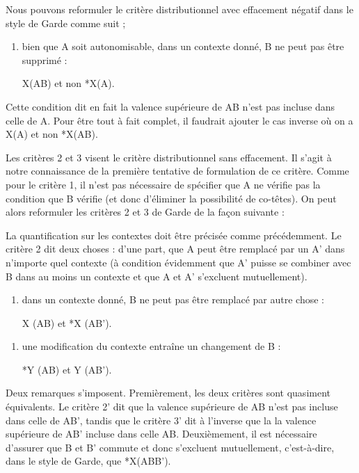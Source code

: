 {   Nous pouvons reformuler le critère distributionnel avec effacement négatif dans le style de Garde comme suit ;
    
    \begin{enumerate}[label=1'.] \item  bien que A soit autonomisable, dans un contexte donné, B ne peut pas être supprimé :
    
    \begin{center}X(AB) et non *X(A).\end{center}
    \end{enumerate}
    
    Cette condition dit en fait la valence supérieure de AB n'est pas incluse dans celle de A.
    Pour être tout à fait complet, il faudrait ajouter le cas inverse où on a X(A) et non *X(AB).
    
    Les critères 2 et 3 visent le critère distributionnel sans effacement. Il s'agit à notre connaissance de la première tentative de formulation de ce critère. Comme pour le critère 1, il n'est pas nécessaire de spécifier que A ne vérifie pas la condition que B vérifie (et donc d'éliminer la possibilité de co-têtes). On peut alors reformuler les critères 2 et 3 de Garde de la façon suivante :
    
    La quantification sur les contextes doit être précisée comme précédemment. Le critère 2 dit deux choses : d’une part, que A peut être remplacé par un A’ dans n’importe quel contexte (à condition évidemment que A’ puisse se combiner avec B dans au moins un contexte et que A et A' s'excluent mutuellement).
    
    \begin{enumerate}[label=2'.] \item dans un contexte donné, B ne peut pas être remplacé par autre chose :
     \begin{center}X (AB) et *X (AB’).\end{center}\end{enumerate}
    
    \begin{enumerate}[label=3'.] \item une modification du contexte entraîne un changement de B :
     \begin{center}*Y (AB) et Y (AB’).\end{center}\end{enumerate}
   
   Deux remarques s'imposent. Premièrement, les deux critères sont quasiment équivalents. Le critère 2' dit que la valence supérieure de AB n'est pas incluse dans celle de AB', tandis que le critère 3' dit à l'inverse que la la valence supérieure de AB' incluse dans celle AB. Deuxièmement, il est nécessaire d'assurer que B et B' commute et donc s'excluent mutuellement, c'est-à-dire, dans le style de Garde, que *X(ABB').

}
